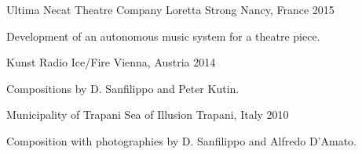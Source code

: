 \begin{cventries}
  \cventry
    {Ultima Necat Theatre Company} %
    {Loretta Strong} %
    {Nancy, France} %
    {2015} %
    {
      \begin{cvitems} %
        \item {Development of an autonomous music system for a theatre piece.}
      \end{cvitems}
    }

  \cventry
    {Kunst Radio} %
    {Ice/Fire} %
    {Vienna, Austria} %
    {2014} %
    {
      \begin{cvitems} %
        \item {Compositions by D. Sanfilippo and Peter Kutin.}
      \end{cvitems}
    }

  \cventry
    {Municipality of Trapani} %
    {Sea of Illusion} %
    {Trapani, Italy} %
    {2010} %
    {
      \begin{cvitems} %
        \item {Composition with photographies by D. Sanfilippo and Alfredo D'Amato.}
      \end{cvitems}
    }

\end{cventries}
